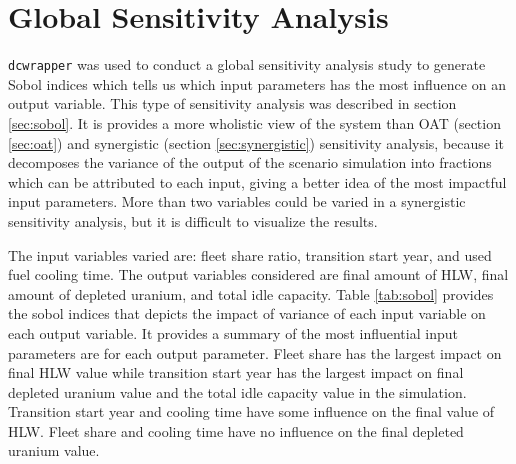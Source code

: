 \section{Global Sensitivity Analysis}
\texttt{dcwrapper} was used to conduct a global sensitivity 
analysis study to generate Sobol indices which tells us which 
input parameters has the most influence on an output variable. 
This type of sensitivity analysis was described in 
section \ref{sec:sobol}. 
It is provides a more wholistic view of the system 
than OAT (section \ref{sec:oat}) and 
synergistic (section \ref{sec:synergistic}) sensitivity 
analysis, because it decomposes the variance of the 
output of the scenario simulation into fractions which can be 
attributed to each input, giving a better idea of the
most impactful input parameters. 
More than two variables could be varied in a synergistic
sensitivity analysis, but it is difficult to visualize the 
results. 

The input variables varied are: fleet share ratio, 
transition start year, and used fuel cooling time.
The output variables considered are final amount of HLW, 
final amount of depleted uranium, and total idle capacity. 
Table \ref{tab:sobol} provides the sobol indices that depicts 
the impact of variance of each input variable on each output 
variable. 
It provides a summary of the most influential input parameters 
are for each output parameter. 
Fleet share has the largest impact on 
final HLW value while transition start year has the largest 
impact on final depleted uranium value and the total idle 
capacity value in the simulation. 
Transition start year and cooling time have some influence on 
the final value of HLW. 
Fleet share and cooling time have no influence on the final 
depleted uranium value. 
    
